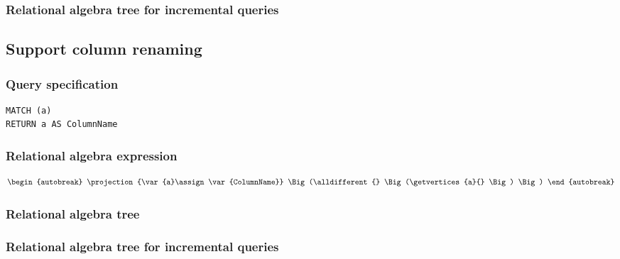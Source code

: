 \subsubsection*{Relational algebra tree for incremental queries}


\subsection{Support column renaming}

\subsubsection*{Query specification}

\begin{lstlisting}
MATCH (a)
RETURN a AS ColumnName
\end{lstlisting}

\subsubsection*{Relational algebra expression}

\begin{align*}
\begin{autobreak}
\projection{\var{a}\assign \var{ColumnName}} \Big(\alldifferent{} \Big(\getvertices{a}{}
\Big)
\Big)
\end{autobreak}
\end{align*}

\subsubsection*{Relational algebra tree}


\subsubsection*{Relational algebra tree for incremental queries}

